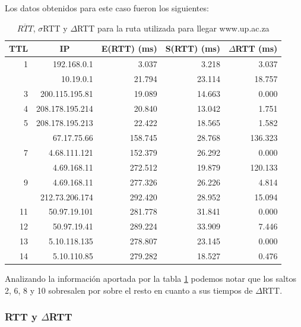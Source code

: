 Los datos obtenidos para este caso fueron los siguientes:

\begin{table}[H]
    \begin{center}
        \begin{tabular}{| r | r | r | r | r |}
  \hline
  {\bf TTL} & \multicolumn{1}{|c|}{\bf IP} & {\bf E(RTT) (ms)} & {\bf S(RTT) (ms)} & {\bf $\Delta$RTT (ms)}\\
  \hline 
\hline 1  & 192.168.0.1 &  3.037 & 3.218 & 3.037\\
\rowcolor{blue!25}\hline 2  & 10.19.0.1 & 21.794 & 23.114 & 18.757\\
\hline 3  & 200.115.195.81 & 19.089 & 14.663 & 0.000\\
\hline 4  & 208.178.195.214 & 20.840 & 13.042 & 1.751\\ 
\hline 5  & 208.178.195.213 & 22.422 & 18.565 & 1.582\\ 
\rowcolor{blue!25}\hline 6  & 67.17.75.66 & 158.745 & 28.768 & 136.323\\ 
\hline 7  & 4.68.111.121 &  152.379 & 26.292 & 0.000\\ 
\rowcolor{blue!25}\hline 8  & 4.69.168.11 & 272.512 & 19.879 & 120.133\\ 
\hline 9  & 4.69.168.11 & 277.326 & 26.226 & 4.814\\ 
\rowcolor{blue!25}\hline 10  & 212.73.206.174 & 292.420 & 28.952 & 15.094\\ 
\hline 11  & 50.97.19.101 & 281.778 & 31.841 & 0.000\\ 
\hline 12  & 50.97.19.41 & 289.224 & 33.909 & 7.446\\ 
\hline 13  & 5.10.118.135 & 278.807 & 23.145 & 0.000\\ 
\hline 14  & 5.10.110.85 & 279.282 & 18.527 & 0.476\\ 
\hline
        \end{tabular}
        \caption{$\overline{RTT}$, $\sigma$RTT y $\Delta$RTT para la ruta utilizada para llegar www.up.ac.za}
        \label{table:pretoria} 
    \end{center}
\end{table}

Analizando la información aportada por la tabla \ref{table:pretoria} podemos notar que los saltos 2, 6, 8 y 10 sobresalen por sobre el resto en cuanto a sus tiempos de $\Delta$RTT. 

\subsubsection{RTT y $\Delta$RTT}


